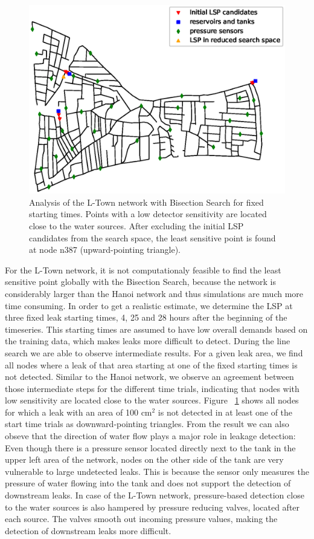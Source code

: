 \begin{figure}[h]
\centering
\includegraphics[height=0.3\textheight,width=\textwidth,keepaspectratio=True]{Figures/lsp_candidates_ltown.eps}
\caption{Analysis of the L-Town network with Bisection Search for fixed
starting times. Points with a low detector sensitivity are located
close to the water sources. After excluding the initial LSP candidates from
the search space, the least sensitive point is found at node n387
(upward-pointing triangle).}
\label{fig:lsp_candidates_ltown}
\end{figure}
For the L-Town network, it is not computationaly feasible to find the least sensitive
point globally with the Bisection Search, because the network is considerably
larger than the Hanoi network and thus simulations are much more time
consuming. In order to get a realistic estimate, we determine the LSP at
three fixed leak starting times, 4, 25 and 28 hours after the beginning of the
timeseries. This starting times are assumed to have low overall demands
based on the training data, which makes leaks more difficult to detect. During the line search we are able to observe intermediate results. 
For a given leak area, we find all nodes where a leak
of that area starting at one of the fixed starting times is not detected.
Similar to the Hanoi network, we observe an agreement between those intermediate
steps for the different time trials, indicating that nodes with low
sensitivity are located close to the water sources. Figure
~\ref{fig:lsp_candidates_ltown} shows all nodes for which a leak with an
area of 100 $\text{cm}^2$ is not detected in at least one of the start time
trials as downward-pointing triangles. From the result we can also obseve that the direction of water flow plays a major role in leakage detection: Even though there is a pressure sensor
located directly next to the tank in the upper left area of the network, nodes
on the other side of the tank are very vulnerable to large undetected leaks.
This is because the sensor only measures the pressure of water flowing into
the tank and does not support the detection of downstream leaks. In case of
the L-Town network, pressure-based detection close to the water sources is
also hampered by pressure reducing valves, located after each source. The
valves smooth out incoming pressure values, making the detection of downstream
leaks more difficult.

